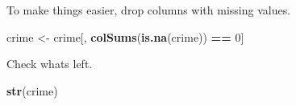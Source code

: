 \documentclass[
]{article}
\newenvironment{Shaded}{\begin{snugshade}}{\end{snugshade}}
\newcommand{\DecValTok}[1]{\textcolor[rgb]{0.00,0.00,0.81}{#1}}
\newcommand{\FunctionTok}[1]{\textcolor[rgb]{0.13,0.29,0.53}{\textbf{#1}}}
\newcommand{\NormalTok}[1]{#1}
\newcommand{\OtherTok}[1]{\textcolor[rgb]{0.56,0.35,0.01}{#1}}
\newcommand{\SpecialCharTok}[1]{\textcolor[rgb]{0.81,0.36,0.00}{\textbf{#1}}}
\begin{document}
To make things easier, drop columns with missing values.

\begin{Shaded}
\begin{Highlighting}[]
\NormalTok{crime }\OtherTok{\textless{}{-}}\NormalTok{ crime[, }\FunctionTok{colSums}\NormalTok{(}\FunctionTok{is.na}\NormalTok{(crime)) }\SpecialCharTok{==} \DecValTok{0}\NormalTok{]}
\end{Highlighting}
\end{Shaded}

Check whats left.

\begin{Shaded}
\begin{Highlighting}[]
\FunctionTok{str}\NormalTok{(crime)}
\end{Highlighting}
\end{Shaded}
\end{document}
